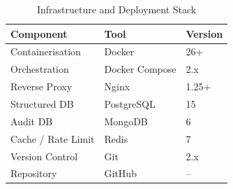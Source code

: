 \begin{table}[H]
\centering
\caption{Infrastructure and Deployment Stack}
\begin{tabular}{@{}lll@{}}
\toprule
\textbf{Component} & \textbf{Tool} & \textbf{Version} \\
\midrule
Containerisation & Docker & 26+ \\
Orchestration & Docker Compose & 2.x \\
Reverse Proxy & Nginx & 1.25+ \\
Structured DB & PostgreSQL & 15 \\
Audit DB & MongoDB & 6 \\
Cache / Rate Limit & Redis & 7 \\
Version Control & Git & 2.x \\
Repository & GitHub & -- \\
\bottomrule
\end{tabular}
\end{table}
